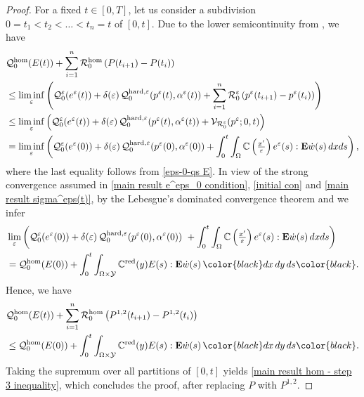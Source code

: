 \documentclass[reqno,10pt]{amsart}
\numberwithin{equation}{section}
\theoremstyle{remark}
\newcommand{\BLACK}{\color{black}}
\newcommand{\PINK}{\color{black}}
\newcommand{\C}{\mathbb{C}}
\newcommand{\calQ}{\mathcal{Q}}
\newcommand{\calR}{\mathcal{R}}
\newcommand{\calV}{\mathcal{V}}
\newcommand{\calY}{\mathcal{Y}}
\newcommand{\eps}{\varepsilon}
\newcommand{\E}{{\bf E}}
\newcommand{\red}[1]{#1^{\rm red}}
\begin{document}
\begin{proof}
For a fixed $t \in [0,T]$, let us consider a subdivision $0 = t_1 < t_2 < \ldots < t_n = t$ of $[0,t]$. 
Due to the lower semicontinuity from , we have 
\begin{align*}
	& \calQ^{\rm hom}_{0}(E(t)) + \sum_{i = 1}^{n} \calR^{\rm hom}_{0}\left(P(t_{i+1}) - P(t_i)\right)\\
	& \leq \liminf\limits_{\eps}\left( \calQ^{\eps}_{0}(e^\eps(t)) + \delta(\eps)\,\calQ^{\rm hard,\eps}_{0}(p^\eps(t), \alpha^\eps(t)) + \sum_{i = 1}^{n} \calR^{\eps}_{0}\left(p^\eps(t_{i+1}) - p^\eps(t_i)\right) \right)\\
	& \leq \liminf\limits_{\eps}\left( \calQ^{\eps}_{0}(e^\eps(t)) + \delta(\eps)\,\calQ^{\rm hard,\eps}_{0}(p^\eps(t), \alpha^\eps(t)) + \calV_{\calR^{\eps}_{0}}(p^\eps; 0, t) \right)\\
	& = \liminf\limits_{\eps}\left( \calQ^{\eps}_{0}(e^\eps(0)) + \delta(\eps)\,\calQ^{\rm hard,\eps}_{0}(p^\eps(0), \alpha^\eps(0))
	+ \int_0^t \int_{\Omega} \C\left(\tfrac{x'}{\eps}\right) e^\eps(s) : {\E}\dot{w}(s) \,dx ds \right),
\end{align*}
where the last equality follows from \ref{eps-0-qs E}. 
In view of the strong convergence assumed in \eqref{main result e^eps_0 condition}, \eqref{initial con} and \eqref{main result sigma^eps(t)}, by the Lebesgue's dominated convergence theorem and  we infer
\begin{align*}
	& \lim\limits_{\eps}\left( \calQ^{\eps}_{0}(e^\eps(0)) + \delta(\eps)\,\calQ^{\rm hard,\eps}_{0}(p^\eps(0), \alpha^\eps(0)) \
	+ \int_0^t \int_{\Omega} \C\left(\tfrac{x'}{\eps}\right) e^\eps(s) : {\E}\dot{w}(s) \,dx ds \right)\\
	& = \calQ^{\rm hom}_{0}(E(0)) 
	+ \int_0^t \int_{\Omega \times \calY} \red{\C}(y) E(s) : {\E}\dot{w}(s) \,{\PINK dx\,dy\,ds\BLACK}.
\end{align*}
Hence, we have
\begin{align*}
	& \calQ^{\rm hom}_{0}(E(t)) + \sum_{i = 1}^{n} \calR^{\rm hom}_{0}\left(P^{1,2}(t_{i+1}) - P^{1,2}(t_i)\right) \\
	& \leq \calQ^{\rm hom}_{0}(E(0)) 
	+ \int_0^t \int_{\Omega \times \calY} \red{\C}(y) E(s) : {\E}\dot{w}(s) \,{\PINK dx\,dy\,ds\BLACK}.
\end{align*}
Taking the supremum over all partitions of $[0,t]$ yields \eqref{main result hom - step 3 inequality}, which concludes the proof, after replacing $P$ with $P^{1,2}$. 
\end{proof}
\end{document}

